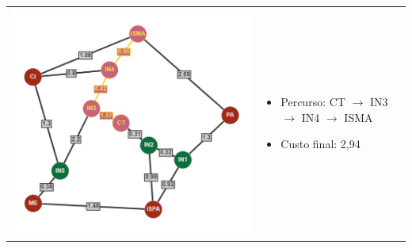 \documentclass[12pt]{article}
\begin{document}
    \begin{tabular}{@{}m{}m{}@{}}
      \centering\includegraphics[scale=0.4]{anexos/CT-ISMA.png} &
      \begin{itemize}
        \item Percurso: CT $\rightarrow$ IN3 $\rightarrow$ IN4 $\rightarrow$ ISMA
        \item Custo final: 2,94
      \end{itemize}
    \end{tabular}
    
\end{document}
